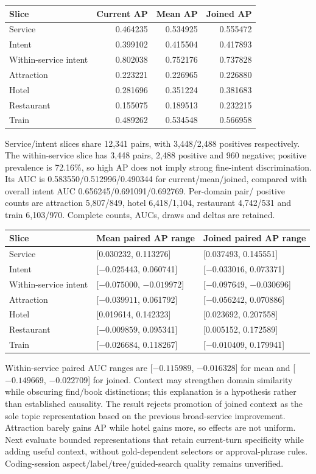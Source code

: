 \documentclass[11pt]{article}
\begin{document}
\begin{center}
\begin{tabular}{lrrr}
\toprule
Slice & Current AP & Mean AP & Joined AP \\
\midrule
Service & 0.464235 & 0.534925 & 0.555472 \\
Intent & 0.399102 & 0.415504 & 0.417893 \\
Within-service intent & 0.802038 & 0.752176 & 0.737828 \\
Attraction & 0.223221 & 0.226965 & 0.226880 \\
Hotel & 0.281696 & 0.351224 & 0.381683 \\
Restaurant & 0.155075 & 0.189513 & 0.232215 \\
Train & 0.489262 & 0.534548 & 0.566958 \\
\bottomrule
\end{tabular}
\end{center}
Service/intent slices share 12,341 pairs, with 3,448/2,488 positives respectively.
The within-service slice has 3,448 pairs, 2,488 positive and 960 negative;
positive prevalence is 72.16\%, so high AP does not imply strong fine-intent
discrimination. Its AUC is 0.583550/0.512996/0.490344 for current/mean/joined,
compared with overall intent AUC 0.656245/0.691091/0.692769. Per-domain pair/
positive counts are attraction 5,807/849, hotel 6,418/1,104, restaurant 4,742/531
and train 6,103/970. Complete counts, AUCs, draws and deltas are retained.

\begin{center}
\begin{tabular}{lll}
\toprule
Slice & Mean paired AP range & Joined paired AP range \\
\midrule
Service & [0.030232, 0.113276] & [0.037493, 0.145551] \\
Intent & [$-0.025443$, 0.060741] & [$-0.033016$, 0.073371] \\
Within-service intent & [$-0.075000$, $-0.019972$] & [$-0.097649$, $-0.030696$] \\
Attraction & [$-0.039911$, 0.061792] & [$-0.056242$, 0.070886] \\
Hotel & [0.019614, 0.142323] & [0.023692, 0.207558] \\
Restaurant & [$-0.009859$, 0.095341] & [0.005152, 0.172589] \\
Train & [$-0.026684$, 0.118267] & [$-0.010409$, 0.179941] \\
\bottomrule
\end{tabular}
\end{center}
Within-service paired AUC ranges are [$-0.115989$, $-0.016328$] for mean and
[$-0.149669$, $-0.022709$] for joined. Context may strengthen domain similarity
while obscuring find/book distinctions; this explanation is a hypothesis rather
than established causality. The result rejects promotion of joined context as
the sole topic representation based on the previous broad-service improvement.
Attraction barely gains AP while hotel gains more, so effects are not uniform.
Next evaluate bounded representations that retain current-turn specificity while
adding useful context, without gold-dependent selectors or approval-phrase rules.
Coding-session aspect/label/tree/guided-search quality remains unverified.
\end{document}
